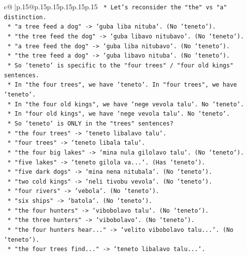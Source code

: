 \documentclass{article}
\begin{document}
{\begin{supertabular}{c@{$\;$}|p{.15\linewidth}@{}p{.15\linewidth}p{.15\linewidth}p{.15\linewidth}p{.15\linewidth}p{.15\linewidth}}
{{{\texttt{    *   Let's reconsider the "the" vs "a" distinction.} \\
\texttt{    *   "a tree feed a dog" {-}> `guba liba nituba`. (No `teneto`).} \\
\texttt{    *   "the tree feed the dog" {-}> `guba libavo nitubavo`. (No `teneto`).} \\
\texttt{    *   "a tree feed the dog" {-}> `guba liba nitubavo`. (No `teneto`).} \\
\texttt{    *   "the tree feed a dog" {-}> `guba libavo nituba`. (No `teneto`).} \\
\texttt{    *   So `teneto` is specific to the "four trees" / "four old kings" sentences.} \\
\texttt{    *   In "the four trees", we have `teneto`. In "four trees", we have `teneto`.} \\
\texttt{    *   In "the four old kings", we have `nege vevola talu`. No `teneto`.} \\
\texttt{    *   In "four old kings", we have `nege vevola talu`. No `teneto`.} \\
\texttt{    *   So `teneto` is ONLY in the "trees" sentences?} \\
\texttt{    *   "the four trees" {-}> `teneto libalavo talu`.} \\
\texttt{    *   "four trees" {-}> `teneto libala talu`.} \\
\texttt{    *   "the four big lakes" {-}> `mina nula gilolavo talu`. (No `teneto`).} \\
\texttt{    *   "five lakes" {-}> `teneto gilola va...`. (Has `teneto`).} \\
\texttt{    *   "five dark dogs" {-}> `mina nena nitubala`. (No `teneto`).} \\
\texttt{    *   "two cold kings" {-}> `neli tivobu vevola`. (No `teneto`).} \\
\texttt{    *   "four rivers" {-}> `vebola`. (No `teneto`).} \\
\texttt{    *   "six ships" {-}> `batola`. (No `teneto`).} \\
\texttt{    *   "the four hunters" {-}> `vibobolavo talu`. (No `teneto`).} \\
\texttt{    *   "the three hunters" {-}> `vibobolavo`. (No `teneto`).} \\
\texttt{    *   "the four hunters hear..." {-}> `velito vibobolavo talu...`. (No `teneto`).} \\
\texttt{    *   "the four trees find..." {-}> `teneto libalavo talu...`.} \\
}}}
\end{supertabular}}
\end{document}
